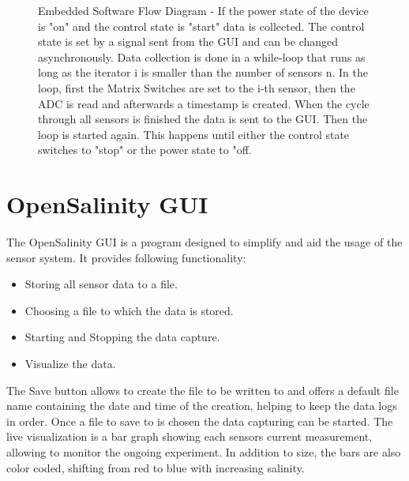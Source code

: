 \begin{figure}
\begin{center}
		\caption{Embedded Software Flow Diagram - If the power state of the device is "on" and  the control state is "start" data is collected. The control state is set by a signal sent from the GUI and can be changed asynchronously. Data collection is done in a while-loop that runs as long as the iterator i is smaller than the number of sensors n. In the loop, first the Matrix Switches are set to the i-th sensor, then the ADC is read and afterwards a timestamp is created. When the cycle through all sensors is finished the data is sent to the GUI. Then the loop is started again. This happens until either the control state switches to "stop" or the power state to "off.}
		\label{fig:flow}
	\end{center}
\end{figure}

\section{OpenSalinity GUI}

The OpenSalinity GUI is a program designed to simplify and aid the usage of the sensor system. It provides following functionality:

\begin{itemize}
	\item Storing all sensor data to a file.
	\item Choosing a file to which the data is stored.
	\item Starting and Stopping the data capture.
	\item Visualize the data.
\end{itemize}

The Save button allows to create the file to be written to and offers a default file name containing the date and time of the creation, helping to keep the data logs in order. Once a file to save to is chosen the data capturing can be started.
The live visualization is a bar graph showing each sensors current measurement, allowing to monitor the ongoing experiment. In addition to size, the bars are also color coded, shifting from red to blue with increasing salinity.\\

